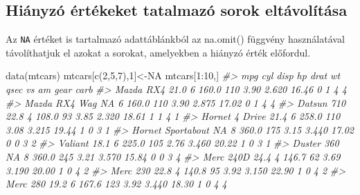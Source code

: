 \documentclass[
]{book}
\newenvironment{Shaded}{\begin{snugshade}}{\end{snugshade}}
\newcommand{\CommentTok}[1]{\textcolor[rgb]{0.56,0.35,0.01}{\textit{#1}}}
\newcommand{\ConstantTok}[1]{\textcolor[rgb]{0.00,0.00,0.00}{#1}}
\newcommand{\DecValTok}[1]{\textcolor[rgb]{0.00,0.00,0.81}{#1}}
\newcommand{\FunctionTok}[1]{\textcolor[rgb]{0.00,0.00,0.00}{#1}}
\newcommand{\NormalTok}[1]{#1}
\newcommand{\OtherTok}[1]{\textcolor[rgb]{0.56,0.35,0.01}{#1}}
\newcommand{\SpecialCharTok}[1]{\textcolor[rgb]{0.00,0.00,0.00}{#1}}
\begin{document}
\hypertarget{hiuxe1nyzuxf3-uxe9rtuxe9keket-tatalmazuxf3-sorok-eltuxe1voluxedtuxe1sa}{%
\subsection{Hiányzó értékeket tatalmazó sorok eltávolítása}\label{hiuxe1nyzuxf3-uxe9rtuxe9keket-tatalmazuxf3-sorok-eltuxe1voluxedtuxe1sa}}

Az \texttt{NA} értéket is tartalmazó adattáblánkból az na.omit() függvény használatával távolíthatjuk el azokat a sorokat, amelyekben a hiányzó érték előfordul.

\begin{Shaded}
\begin{Highlighting}[]
\FunctionTok{data}\NormalTok{(mtcars)}
\NormalTok{mtcars[}\FunctionTok{c}\NormalTok{(}\DecValTok{2}\NormalTok{,}\DecValTok{5}\NormalTok{,}\DecValTok{7}\NormalTok{),}\DecValTok{1}\NormalTok{]}\OtherTok{\textless{}{-}}\ConstantTok{NA}
\NormalTok{mtcars[}\DecValTok{1}\SpecialCharTok{:}\DecValTok{10}\NormalTok{,]}
\CommentTok{\#\textgreater{}                    mpg cyl  disp  hp drat    wt  qsec vs am gear carb}
\CommentTok{\#\textgreater{} Mazda RX4         21.0   6 160.0 110 3.90 2.620 16.46  0  1    4    4}
\CommentTok{\#\textgreater{} Mazda RX4 Wag       NA   6 160.0 110 3.90 2.875 17.02  0  1    4    4}
\CommentTok{\#\textgreater{} Datsun 710        22.8   4 108.0  93 3.85 2.320 18.61  1  1    4    1}
\CommentTok{\#\textgreater{} Hornet 4 Drive    21.4   6 258.0 110 3.08 3.215 19.44  1  0    3    1}
\CommentTok{\#\textgreater{} Hornet Sportabout   NA   8 360.0 175 3.15 3.440 17.02  0  0    3    2}
\CommentTok{\#\textgreater{} Valiant           18.1   6 225.0 105 2.76 3.460 20.22  1  0    3    1}
\CommentTok{\#\textgreater{} Duster 360          NA   8 360.0 245 3.21 3.570 15.84  0  0    3    4}
\CommentTok{\#\textgreater{} Merc 240D         24.4   4 146.7  62 3.69 3.190 20.00  1  0    4    2}
\CommentTok{\#\textgreater{} Merc 230          22.8   4 140.8  95 3.92 3.150 22.90  1  0    4    2}
\CommentTok{\#\textgreater{} Merc 280          19.2   6 167.6 123 3.92 3.440 18.30  1  0    4    4}
\end{Highlighting}
\end{Shaded}
\end{document}
